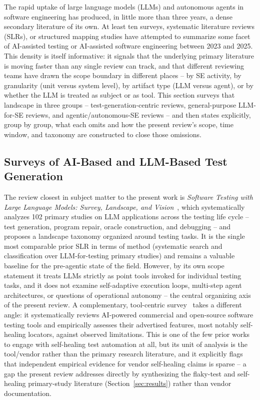 The rapid uptake of large language models (LLMs) and autonomous
agents in software engineering has produced, in little more than
three years, a dense secondary literature of its own. At least ten
surveys, systematic literature reviews (SLRs), or structured mapping
studies have attempted to summarize some facet of AI-assisted
testing or AI-assisted software engineering between 2023 and 2025.
This density is itself informative: it signals that the underlying
primary literature is moving faster than any single review can track,
and that different reviewing teams have drawn the scope boundary in
different places -- by SE activity, by granularity (unit versus
system level), by artifact type (LLM versus agent), or by whether the
LLM is treated as subject or as tool. This section surveys that
landscape in three groups -- test-generation-centric reviews,
general-purpose LLM-for-SE reviews, and agentic/autonomous-SE reviews
-- and then states explicitly, group by group, what each omits and
how the present review's scope, time window, and taxonomy are
constructed to close those omissions.

\subsection{Surveys of AI-Based and LLM-Based Test Generation}
\label{subsec:prior-surveys-gen}

The review closest in subject matter to the present work is
\emph{Software Testing with Large Language
Models: Survey, Landscape, and Vision}~\cite{slr0012024}, which systematically analyzes
102 primary studies on LLM applications across the testing
life cycle -- test generation, program repair, oracle construction,
and debugging -- and proposes a landscape taxonomy organized around
testing tasks. It is the single most comparable prior SLR in terms of
method (systematic search and classification over LLM-for-testing
primary studies) and remains a valuable baseline for the pre-agentic
state of the field. However, by its own scope statement it treats
LLMs strictly as point tools invoked for individual testing tasks,
and it does not examine self-adaptive execution loops, multi-step
agent architectures, or questions of operational autonomy -- the
central organizing axis of the present review. A complementary,
tool-centric survey~\cite{slr0092024}
takes a different angle: it systematically reviews
AI-powered commercial and open-source software testing tools and
empirically assesses their advertised features, most notably
self-healing locators, against observed limitations. This is one of
the few prior works to engage with self-healing test automation at
all, but its unit of analysis is the tool/vendor rather than the
primary research literature, and it explicitly flags that independent
empirical evidence for vendor self-healing claims is sparse -- a gap
the present review addresses directly by synthesizing the flaky-test
and self-healing primary-study literature (Section~\ref{sec:results})
rather than vendor documentation.

